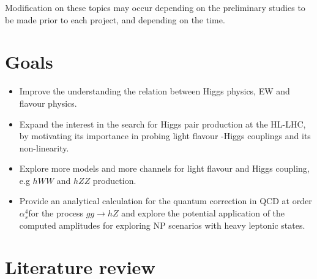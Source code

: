 \documentclass[12pt]{article}
\begin{document}
\begin{minipage}{ 0.25\linewidth}
\begin{center}
	\end{center}
\end{minipage}
Modification on these topics may occur depending on the preliminary studies to be made prior to each project, and depending on the time.
  \section*{Goals}
   \begin{itemize}
  	\item Improve the understanding the relation between Higgs physics, EW and flavour physics.
  	\item Expand the interest in the search for Higgs pair production at the HL-LHC, by motivating its importance in probing light flavour -Higgs couplings and its non-linearity.
  	\item Explore more models and more channels for light flavour and Higgs coupling, e.g $ h WW$ and $h ZZ$ production.
    \item Provide an analytical calculation for the quantum correction in QCD  at order $\alpha_s^4$for the process $ gg \to hZ$ and explore the potential application of the computed amplitudes for exploring NP scenarios with heavy leptonic states.
  \end{itemize}
 \section*{Literature review}
\end{document}
